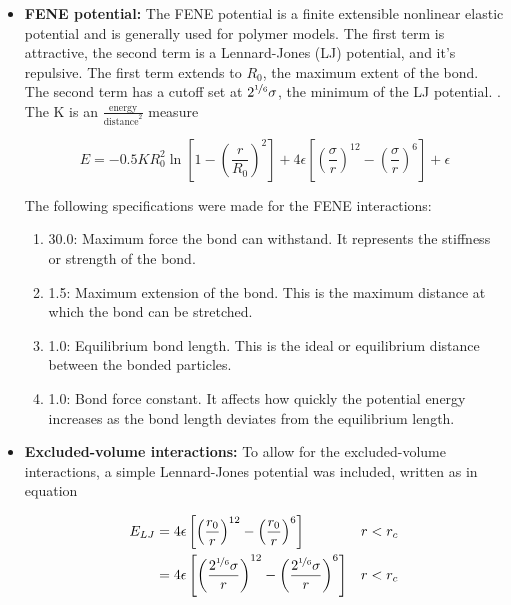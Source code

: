 \begin{itemize}
    \item \textbf{FENE potential: }The FENE potential is a finite extensible nonlinear elastic potential and is generally used for polymer models. The first term is attractive, the second term is a Lennard-Jones (LJ) potential, and it's repulsive. The first term extends to $R_0$, the maximum extent of the bond. The second term has a cutoff set at $2^{\nicefrac{1}{6}} \sigma$, the minimum of the LJ potential.
    \cite{thompsonLAMMPSFlexibleSimulation2022}
    . The K is an $\frac{\text{energy}}{\text{distance}^2}$ measure

    \begin{equation} \label{eq: FENE potential}
        E = -0.5 K R_0^2 \ln{\left[1 - \left(\frac{r}{R_0}\right)^2\right]} + 4 \epsilon \left[\left(\frac{\sigma}{r}\right)^{12} - \left(\frac{\sigma}{r}\right)^6\right] + \epsilon
    \end{equation}

    The following specifications were made for the FENE interactions:

    \begin{enumerate} %
        \item 30.0: Maximum force the bond can withstand. It represents the stiffness or strength of the bond.
        \item 1.5: Maximum extension of the bond. This is the maximum distance at which the bond can be stretched.
        \item 1.0: Equilibrium bond length. This is the ideal or equilibrium distance between the bonded particles.
        \item 1.0: Bond force constant. It affects how quickly the potential energy increases as the bond length deviates from the equilibrium length.
    \end{enumerate}

    \item \textbf{Excluded-volume interactions: } To allow for the excluded-volume interactions, a simple Lennard-Jones potential was included, written as in equation %

    \begin{align} \label{eq: lennard jones potential}
        E_{LJ} &= 4 \epsilon \left[\left(\frac{r_0}{r}\right)^{12} - \left(\frac{r_0}{r}\right)^6\right]&& r < r_c \nonumber\\
            &= 4 \epsilon \left[\left(\frac{2^{\nicefrac{1}{6}}\sigma}{r}\right)^{12} - \left(\frac{2^{\nicefrac{1}{6}}\sigma}{r}\right)^6\right]&& r < r_c 
    \end{align}



\end{itemize}
